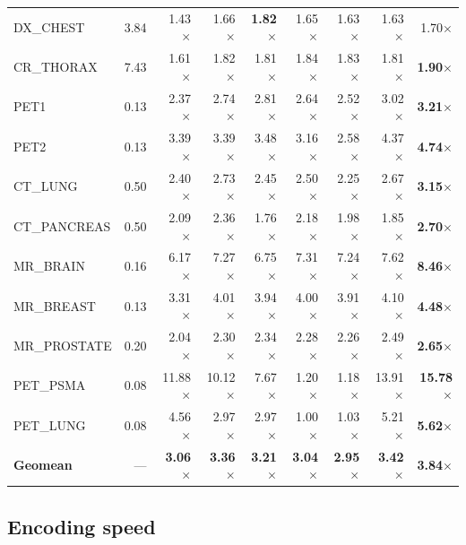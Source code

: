\documentclass[journal]{IEEEtran}
\begin{document}
\begin{table}[t]
\begin{tabular}{lrrrrrrrr}
DX\_CHEST      & 3.84 & 1.43$\times$ & 1.66$\times$ & \textbf{1.82$\times$} & 1.65$\times$ & 1.63$\times$ & 1.63$\times$ & 1.70$\times$ \\
CR\_THORAX     & 7.43 & 1.61$\times$ & 1.82$\times$ & 1.81$\times$ & 1.84$\times$ & 1.83$\times$ & 1.81$\times$ & \textbf{1.90$\times$} \\
PET1           & 0.13 & 2.37$\times$ & 2.74$\times$ & 2.81$\times$ & 2.64$\times$ & 2.52$\times$ & 3.02$\times$ & \textbf{3.21$\times$} \\
PET2           & 0.13 & 3.39$\times$ & 3.39$\times$ & 3.48$\times$ & 3.16$\times$ & 2.58$\times$ & 4.37$\times$ & \textbf{4.74$\times$} \\
CT\_LUNG       & 0.50 & 2.40$\times$ & 2.73$\times$ & 2.45$\times$ & 2.50$\times$ & 2.25$\times$ & 2.67$\times$ & \textbf{3.15$\times$} \\
CT\_PANCREAS   & 0.50 & 2.09$\times$ & 2.36$\times$ & 1.76$\times$ & 2.18$\times$ & 1.98$\times$ & 1.85$\times$ & \textbf{2.70$\times$} \\
MR\_BRAIN      & 0.16 & 6.17$\times$ & 7.27$\times$ & 6.75$\times$ & 7.31$\times$ & 7.24$\times$ & 7.62$\times$ & \textbf{8.46$\times$} \\
MR\_BREAST     & 0.13 & 3.31$\times$ & 4.01$\times$ & 3.94$\times$ & 4.00$\times$ & 3.91$\times$ & 4.10$\times$ & \textbf{4.48$\times$} \\
MR\_PROSTATE   & 0.20 & 2.04$\times$ & 2.30$\times$ & 2.34$\times$ & 2.28$\times$ & 2.26$\times$ & 2.49$\times$ & \textbf{2.65$\times$} \\
PET\_PSMA      & 0.08 & 11.88$\times$ & 10.12$\times$ & 7.67$\times$ & 1.20$\times$ & 1.18$\times$ & 13.91$\times$ & \textbf{15.78$\times$} \\
PET\_LUNG      & 0.08 & 4.56$\times$ & 2.97$\times$ & 2.97$\times$ & 1.00$\times$ & 1.03$\times$ & 5.21$\times$ & \textbf{5.62$\times$} \\
\midrule
\textbf{Geomean} & --- & \textbf{3.06$\times$} & \textbf{3.36$\times$} & \textbf{3.21$\times$} & \textbf{3.04$\times$} & \textbf{2.95$\times$} & \textbf{3.42$\times$} & \textbf{3.84$\times$} \\
\bottomrule
\end{tabular}
\end{table}

\subsection{Encoding speed}
\end{document}
